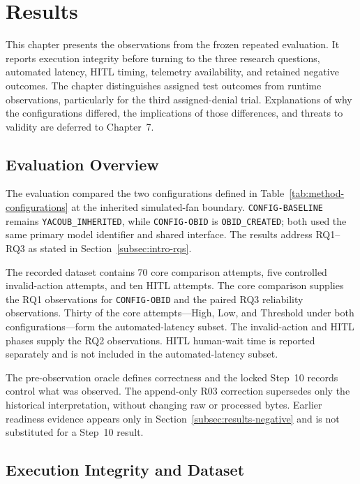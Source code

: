 \section{Results}\label{sec:results}

\setlength{\emergencystretch}{4em}

This chapter presents the observations from the frozen repeated evaluation. It
reports execution integrity before turning to the three research questions,
automated latency, HITL timing, telemetry availability, and retained negative
outcomes. The chapter distinguishes assigned test outcomes from runtime
observations, particularly for the third assigned-denial trial. Explanations
of why the configurations differed, the implications of those differences,
and threats to validity are deferred to Chapter~7.

\subsection{Evaluation Overview}\label{subsec:results-overview}

The evaluation compared the two configurations defined in
Table~\ref{tab:method-configurations} at the inherited simulated-fan boundary.
\texttt{CONFIG-BASELINE} remains \texttt{YACOUB\_INHERITED}, while
\texttt{CONFIG-OBID} is \texttt{OBID\_CREATED}; both used the same primary model
identifier and shared interface. The results address RQ1--RQ3 as stated in
Section~\ref{subsec:intro-rqs}.

The recorded dataset contains 70 core comparison attempts, five controlled
invalid-action attempts, and ten HITL attempts. The core comparison supplies
the RQ1 observations for \texttt{CONFIG-OBID} and the paired RQ3 reliability
observations. Thirty of the core attempts---High, Low, and Threshold under both
configurations---form the automated-latency subset. The invalid-action and HITL
phases supply the RQ2 observations. HITL human-wait time is reported separately
and is not included in the automated-latency subset.

The pre-observation oracle defines correctness and the locked Step~10 records
control what was observed. The append-only R03 correction supersedes only the
historical interpretation, without changing raw or processed bytes. Earlier
readiness evidence appears only in Section~\ref{subsec:results-negative} and is
not substituted for a Step~10 result.

\subsection{Execution Integrity and Dataset}\label{subsec:results-integrity}

